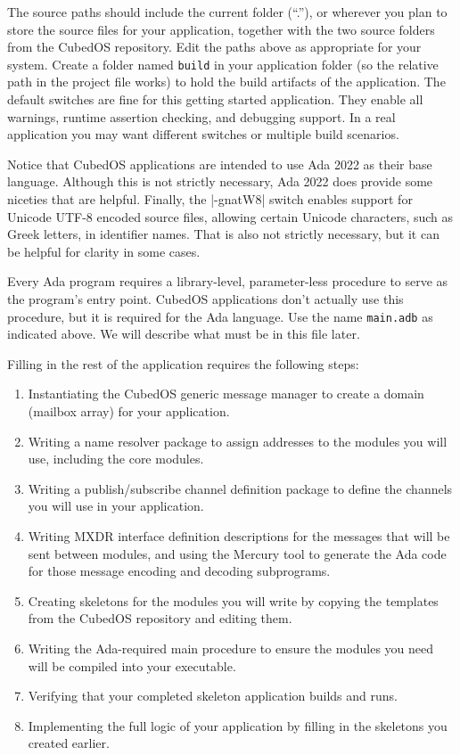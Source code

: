 The source paths should include the current folder (``.''), or wherever you plan to store the
source files for your application, together with the two source folders from the CubedOS
repository. Edit the paths above as appropriate for your system. Create a folder named
\texttt{build} in your application folder (so the relative path in the project file works) to
hold the build artifacts of the application. The default switches are fine for this getting
started application. They enable all warnings, runtime assertion checking, and debugging
support. In a real application you may want different switches or multiple build scenarios.

Notice that CubedOS applications are intended to use Ada 2022 as their base language. Although
this is not strictly necessary, Ada 2022 does provide some niceties that are helpful. Finally,
the |-gnatW8| switch enables support for Unicode UTF-8 encoded source files, allowing certain
Unicode characters, such as Greek letters, in identifier names. That is also not strictly
necessary, but it can be helpful for clarity in some cases.

Every Ada program requires a library-level, parameter-less procedure to serve as the program's
entry point. CubedOS applications don't actually use this procedure, but it is required for the
Ada language. Use the name \texttt{main.adb} as indicated above. We will describe what must be
in this file later.

Filling in the rest of the application requires the following steps:
\begin{enumerate}
\item Instantiating the CubedOS generic message manager to create a domain (mailbox array) for
  your application.
\item Writing a name resolver package to assign addresses to the modules you will use, including
  the core modules.
\item Writing a publish/subscribe channel definition package to define the channels you will use
  in your application.
\item Writing MXDR interface definition descriptions for the messages that will be sent between
  modules, and using the Mercury tool to generate the Ada code for those message encoding and
  decoding subprograms.
\item Creating skeletons for the modules you will write by copying the templates from the
  CubedOS repository and editing them.
\item Writing the Ada-required main procedure to ensure the modules you need will be compiled
  into your executable.
\item Verifying that your completed skeleton application builds and runs.
\item Implementing the full logic of your application by filling in the skeletons you created
  earlier.
\end{enumerate}
